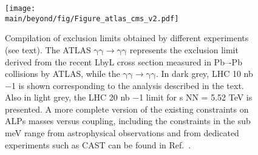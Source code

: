 \begin{figure}[!htbp]
\centering
  \texttt{[image: \\main/beyond/fig/Figure\_atlas\_cms\_v2.pdf]}
  \caption{Compilation of exclusion limits obtained by different experiments (see text). The ATLAS $\mathrm{\gamma\gamma\rightarrow\gamma\gamma}$ represents the exclusion limit derived from the recent LbyL cross section measured in Pb–-Pb collisions by ATLAS, while the  $\mathrm{\gamma\gamma\rightarrow\gamma\gamma}$. In dark grey, LHC 10 nb −1 is shown corresponding to the analysis described in the text. Also in light grey, the LHC 20 nb −1 limit for s NN = 5.52 TeV is presented. A more complete version of the existing constraints on ALPs masses versus coupling, including the constraints in the sub meV range from astrophysical observations and from dedicated experiments such as CAST can be found in Ref.~\cite{Bauer:2017ris}.}
  \label{fig:alp-lambda-limits-cms}
\end{figure}



